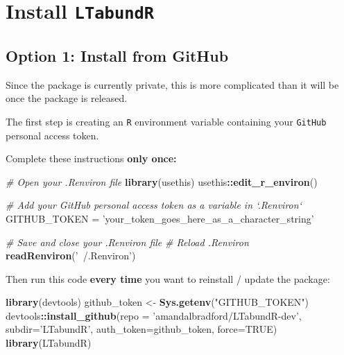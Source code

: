 \documentclass[
]{book}
\newenvironment{Shaded}{\begin{snugshade}}{\end{snugshade}}
\newcommand{\CommentTok}[1]{\textcolor[rgb]{0.56,0.35,0.01}{\textit{#1}}}
\newcommand{\DataTypeTok}[1]{\textcolor[rgb]{0.13,0.29,0.53}{#1}}
\newcommand{\KeywordTok}[1]{\textcolor[rgb]{0.13,0.29,0.53}{\textbf{#1}}}
\newcommand{\NormalTok}[1]{#1}
\newcommand{\OperatorTok}[1]{\textcolor[rgb]{0.81,0.36,0.00}{\textbf{#1}}}
\newcommand{\OtherTok}[1]{\textcolor[rgb]{0.56,0.35,0.01}{#1}}
\newcommand{\StringTok}[1]{\textcolor[rgb]{0.31,0.60,0.02}{#1}}
\begin{document}
\hypertarget{install}{%
\chapter{\texorpdfstring{Install \texttt{LTabundR}}{Install LTabundR}}\label{install}}

\hypertarget{option-1-install-from-github}{%
\section*{Option 1: Install from GitHub}\label{option-1-install-from-github}}

Since the package is currently private, this is more complicated than it will be once the package is released.

The first step is creating an \texttt{R} environment variable containing your \texttt{GitHub} personal access token.

Complete these instructions \textbf{only once:}

\begin{Shaded}
\begin{Highlighting}[]
\CommentTok{# Open your .Renviron file}
\KeywordTok{library}\NormalTok{(usethis)}
\NormalTok{usethis}\OperatorTok{::}\KeywordTok{edit_r_environ}\NormalTok{()}

\CommentTok{# Add your GitHub personal access token as a variable in `.Renviron`}
\NormalTok{GITHUB_TOKEN =}\StringTok{ 'your_token_goes_here_as_a_character_string'}

\CommentTok{# Save and close your .Renviron file}
\CommentTok{# Reload .Renviron}
\KeywordTok{readRenviron}\NormalTok{(}\StringTok{'~/.Renviron'}\NormalTok{)}
\end{Highlighting}
\end{Shaded}

Then run this code \textbf{every time} you want to reinstall / update the package:

\begin{Shaded}
\begin{Highlighting}[]
\KeywordTok{library}\NormalTok{(devtools)}
\NormalTok{github_token <-}\StringTok{ }\KeywordTok{Sys.getenv}\NormalTok{(}\StringTok{"GITHUB_TOKEN"}\NormalTok{)}
\NormalTok{devtools}\OperatorTok{::}\KeywordTok{install_github}\NormalTok{(}\DataTypeTok{repo =} \StringTok{'amandalbradford/LTabundR-dev'}\NormalTok{,}
                         \DataTypeTok{subdir=}\StringTok{'LTabundR'}\NormalTok{,}
                         \DataTypeTok{auth_token=}\NormalTok{github_token,}
                         \DataTypeTok{force=}\OtherTok{TRUE}\NormalTok{)}
\KeywordTok{library}\NormalTok{(LTabundR)}
\end{Highlighting}
\end{Shaded}
\end{document}
